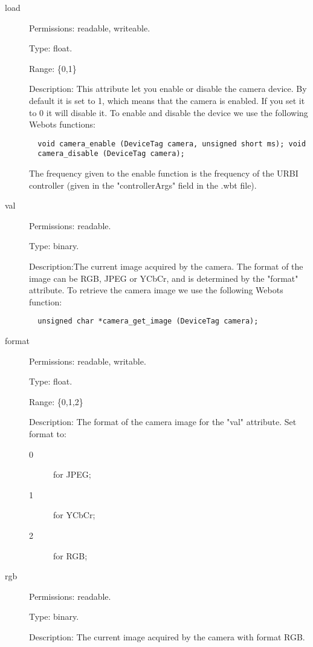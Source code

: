 \noindent
\begin{description}
\item[{load}] Permissions: readable, writeable.


  Type: float.


  Range: \{0,1\}


  Description: This attribute let you enable or disable the camera
  device.  By default it is set to 1, which means that the camera is
  enabled. If you set it to 0 it will disable it.  To enable and
  disable the device we use the following Webots functions:


\begin{lstlisting}
  void camera_enable (DeviceTag camera, unsigned short ms); void
  camera_disable (DeviceTag camera);
\end{lstlisting}

The frequency given to the enable function is the frequency of the
URBI controller (given in the "controllerArgs" field in the .wbt
file).

\item[{val}] Permissions: readable.


  Type: binary.


  Description:The current image acquired by the camera. The format of
  the image can be RGB, JPEG or YCbCr, and is determined by the
  "format" attribute.  To retrieve the camera image we use the
  following Webots function:


\begin{lstlisting}
  unsigned char *camera_get_image (DeviceTag camera);
\end{lstlisting}
\item[{format}] Permissions: readable, writable.


  Type: float.


  Range: \{0,1,2\}


  Description: The format of the camera image for the "val"
  attribute. Set format to:

  \begin{description}
  \item[0] for JPEG;
  \item[1] for YCbCr;
  \item[2] for RGB;
  \end{description}

\item[{rgb}] Permissions: readable.


  Type: binary.


  Description: The current image acquired by the camera with format
  RGB.


\end{description}
